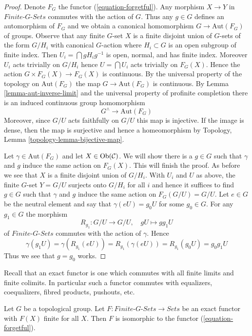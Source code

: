 \begin{proof}
Denote $F_G$ the functor (\ref{equation-forgetful}). Any morphism
$X \to Y$ in $\textit{Finite-}G\textit{-Sets}$ commutes with the action
of $G$. Thus any $g \in G$ defines an automorphism of $F_G$ and
we obtain a canonical homomorphism $G \to \text{Aut}(F_G)$ of groups.
Observe that any finite $G$-set $X$ is a finite disjoint union of
$G$-sets of the form $G/H_i$ with canonical $G$-action where
$H_i \subset G$ is an open subgroup of finite index. Then
$U_i = \bigcap gH_ig^{-1}$ is open, normal, and has finite index.
Moreover $U_i$ acts trivially on $G/H_i$ hence
$U = \bigcap U_i$ acts trivially on $F_G(X)$. Hence the action
$G \times F_G(X) \to F_G(X)$ is continuous. By the universal
property of the topology on $\text{Aut}(F_G)$ the map
$G \to \text{Aut}(F_G)$ is continuous.
By Lemma \ref{lemma-aut-inverse-limit} and the universal property
of profinite completion there is an induced
continuous group homomorphism
$$
G^\wedge \longrightarrow \text{Aut}(F_G)
$$
Moreover, since $G/U$ acts faithfully on $G/U$ this map is
injective. If the image is dense, then the map is surjective and hence a
homeomorphism by Topology, Lemma \ref{topology-lemma-bijective-map}.

\medskip\noindent
Let $\gamma \in \text{Aut}(F_G)$ and let $X \in \mathop{\mathrm{Ob}}\nolimits(\mathcal{C})$.
We will show there is a $g \in G$ such that $\gamma$ and $g$
induce the same action on $F_G(X)$. This will finish the proof.
As before we see that $X$ is a finite disjoint union of $G/H_i$.
With $U_i$ and $U$ as above, the finite $G$-set $Y = G/U$
surjects onto $G/H_i$ for all $i$ and hence it suffices to
find $g \in G$ such that $\gamma$ and $g$ induce the same action
on $F_G(G/U) = G/U$. Let $e \in G$ be the neutral element and
say that $\gamma(eU) = g_0U$ for some $g_0 \in G$. For any
$g_1 \in G$ the morphism
$$
R_{g_1} : G/U \longrightarrow G/U,\quad gU \longmapsto gg_1U
$$
of $\textit{Finite-}G\textit{-Sets}$ commutes with the action of
$\gamma$. Hence
$$
\gamma(g_1U) = \gamma(R_{g_1}(eU)) = R_{g_1}(\gamma(eU)) =
R_{g_1}(g_0U) = g_0g_1U
$$
Thus we see that $g = g_0$ works.
\end{proof}

\noindent
Recall that an exact functor is one which commutes with all
finite limits and finite colimits. In particular such a functor
commutes with equalizers, coequalizers, fibred products,
pushouts, etc.

\begin{lemma}
\label{lemma-second-fundamental-functor}
Let $G$ be a topological group. Let
$F : \textit{Finite-}G\textit{-Sets} \to \textit{Sets}$
be an exact functor with $F(X)$ finite for all $X$.
Then $F$ is isomorphic to the functor (\ref{equation-forgetful}).
\end{lemma}

